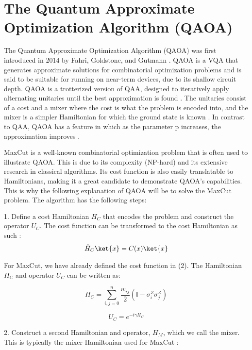 \section{The Quantum Approximate Optimization Algorithm (QAOA)}
The Quantum Approximate Optimization Algorithm (QAOA) was first introduced in 2014 by Fahri, Goldstone, and Gutmann \cite{farhiQAOA}. QAOA is a VQA that generates approximate solutions for combinatorial optimization problems and is said to be suitable for running on near-term devices, due to its shallow circuit depth. QAOA is a trotterized version of QAA, designed to iteratively apply alternating unitaries until the best approximation is found \cite{farhiQAOA}. The unitaries consist of a cost and a mixer where the cost is what the problem is encoded into, and the mixer is a simpler Hamiltonian for which the ground state is known \cite{review2024}. In contrast to QAA, QAOA has a feature in which as the parameter p increases, the approximation improves \cite{farhiQAOA}. 

MaxCut is a well-known combinatorial optimization problem that is often used to illustrate QAOA. This is due to its complexity (NP-hard) and its extensive research in classical algorithms. Its cost function is also easily translatable to Hamiltonians, making it a great candidate to demonstrate QAOA's capabilities. This is why the following explanation of QAOA will be to solve the MaxCut problem. The algorithm has the following steps:

1. Define a cost Hamiltonian $H_C$ that encodes the problem and construct the operator $U_C$. The cost function can be transformed to the cost Hamiltonian as such \cite{review2024}:
\begin{equation} 
        \hat{H}_C \ket{x} = C(x) \ket{x}
    \end{equation}

For MaxCut, we have already defined the cost function in (2). The Hamiltonian $H_C$ and operator $U_C$ can be written as:

\begin{equation} 
    H_C = \sum_{i,j=0}^{n} \frac{w_{ij}}{2} (\mathbb{I} - \sigma_i^Z \sigma_j^Z)
\end{equation}

\begin{equation} 
        U_C = e^{-i \gamma H_C}
\end{equation}

2. Construct a second Hamiltonian and operator, $H_M$, which we call the mixer. This is typically the mixer Hamiltonian used for MaxCut \cite{farhiQAOA}:

